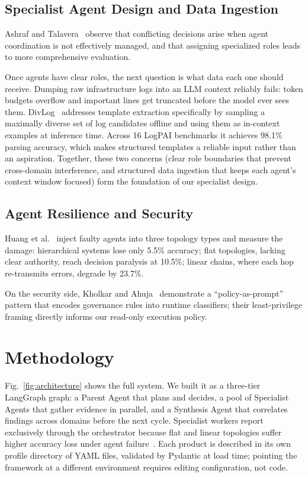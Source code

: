 \documentclass[conference]{IEEEtran}
\begin{document}
\subsection{Specialist Agent Design and Data Ingestion}
Ashraf and Talavera~\cite{ashraf2025autonomous} observe that
conflicting decisions arise when agent coordination is not
effectively managed, and that assigning specialized roles leads to
more comprehensive evaluation.

Once agents have clear roles, the next question is what data each one should receive.
Dumping raw infrastructure logs into an LLM context reliably fails: token
budgets overflow and important lines get truncated before the model
ever sees them. DivLog~\cite{xu2024divlog} addresses template extraction specifically by sampling a
maximally diverse set of log candidates offline and using them as in-context
examples at inference time. Across 16 LogPAI benchmarks it achieves 98.1\% parsing accuracy,
which makes structured templates a reliable input rather than an aspiration.
Together, these two concerns (clear role boundaries that prevent
cross-domain interference, and structured data ingestion that keeps
each agent's context window focused) form the foundation of our
specialist design.

\subsection{Agent Resilience and Security}
Huang
et al.~\cite{huang2024resilience} inject faulty agents into three topology types and measure
the damage: hierarchical systems lose only 5.5\% accuracy; flat topologies, lacking clear
authority, reach decision paralysis at 10.5\%; linear chains, where each hop re-transmits
errors, degrade by 23.7\%.

On the security side, Kholkar and Ahuja~\cite{kholkar2025safeops} demonstrate a
``policy-as-prompt'' pattern that encodes governance rules into runtime classifiers; their
least-privilege framing directly informs our read-only execution policy.


\section{Methodology}



Fig.~\ref{fig:architecture} shows the full system. We built it as a
three-tier LangGraph graph: a Parent Agent that plans and decides, a
pool of Specialist Agents that gather evidence in parallel, and a
Synthesis Agent that correlates findings across domains before the
next cycle. Specialist workers report exclusively through the orchestrator because
flat and linear topologies suffer higher accuracy loss under
agent failure~\cite{huang2024resilience}.
Each product is described in its own profile directory of YAML
files, validated by Pydantic at load time; pointing the framework at
a different environment requires editing configuration, not code.
\end{document}
